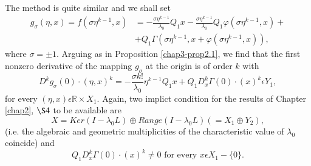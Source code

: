 The method is quite similar and we shall set
\begin{align*}
g_{\sigma}(\eta, x) = f(\sigma \eta^{k-1}, x) & = - \frac{\sigma
  \eta^{k-1}}{\lambda_{0}} Q_{1}x - \frac{\sigma
  \eta^{k-1}}{\lambda_{0}} Q_{1}\varphi(\sigma \eta^{k-1}, x) +\\
& + Q_{1}\Gamma(\sigma \eta^{k-1}, x + \varphi(\sigma \eta^{k-1}, x)),\tag{2.35}\label{chap3-eq2.35}
\end{align*}
where $\sigma = \pm 1$. Arguing as in Proposition \ref{chap3-prop2.1},
we find that the first nonzero derivative of the mapping $g_{\sigma}$
at the origin is of order $k$ with
\begin{equation*}
D^{k}g_{\sigma}(0) \cdot (\eta, x)^{k} = - \frac{\sigma
  k!}{\lambda_{0}} \eta^{k-1} Q_{1} x + Q_{1}D_{x}^{k}\Gamma(0) \cdot
(x)^{k} \epsilon Y_{1},\tag{2.36}\label{chap3-eq2.36}
\end{equation*}
for every $(\eta, x) \epsilon \mathbb{R} \times X_{1}$. Again, two
implict condition for the results of Chapter \ref{chap2}, $\S 4$ to be
available are
$$
X = Ker (I - \lambda_{0}L) \oplus Range (I - \lambda_{0}L)(= X_{1}
\oplus Y_{2}),
$$
(i.e. the algebraic and geometric multiplicities of the
characteristic value of $\lambda_{0}$ coincide) and
$$
Q_{1}D_{x}^{k} \Gamma(0) \cdot (x)^{k} \neq 0 \text{ for every } x
\epsilon X_{1} - \{0\}.
$$

